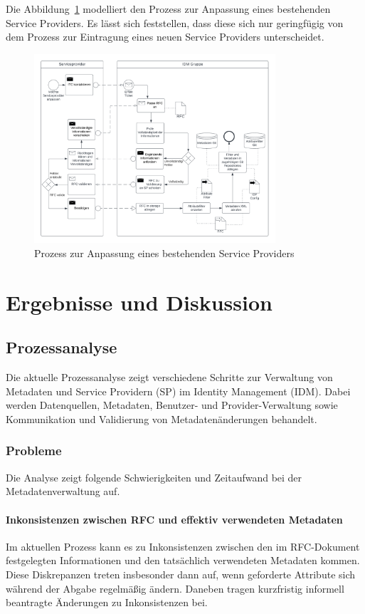 \documentclass[a4paper, fontsize=11pt]{scrartcl}
\begin{document}
Die Abbildung~\ref{fig:service-provider-anpassung} modelliert den Prozess zur Anpassung eines bestehenden Service Providers. Es lässt sich feststellen, dass diese sich nur geringfügig von dem Prozess zur Eintragung eines neuen Service Providers unterscheidet.
\begin{figure}[H]
  \centering
  \includegraphics[width=0.8\textwidth]{res/Serviceprovider Anpassung.png}
  \caption{Prozess zur Anpassung eines bestehenden Service Providers}\label{fig:service-provider-anpassung}
\end{figure}

\section{Ergebnisse und Diskussion}\label{sec:results}

\subsection{Prozessanalyse}\label{subsec:prozessanalyse-results}
Die aktuelle Prozessanalyse zeigt verschiedene Schritte zur Verwaltung von Metadaten und Service Providern (SP) im Identity Management (IDM). 
Dabei werden Datenquellen, Metadaten, Benutzer- und Provider-Verwaltung sowie Kommunikation und Validierung von Metadatenänderungen behandelt.

\subsubsection{Probleme}
Die Analyse zeigt folgende Schwierigkeiten und Zeitaufwand bei der Metadatenverwaltung auf.


\paragraph{Inkonsistenzen zwischen RFC und effektiv verwendeten Metadaten}
Im aktuellen Prozess kann es zu Inkonsistenzen zwischen den im RFC-Dokument festgelegten Informationen und den tatsächlich verwendeten Metadaten kommen. 
Diese Diskrepanzen treten insbesonder dann auf, wenn geforderte Attribute sich während der Abgabe regelmäßig ändern.
Daneben tragen kurzfristig informell beantragte Änderungen zu Inkonsistenzen bei.
\end{document}
